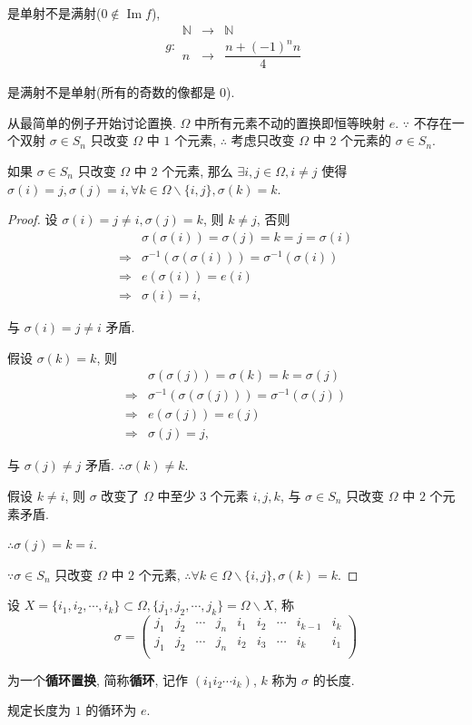 \documentclass{ctexart}
\begin{document}
是单射不是满射($0\notin\operatorname{Im}f$),
\[g:\begin{array}{rcl}
\mathbb{N} & \to & \mathbb{N} \\
n & \to & \dfrac{n+(-1)^nn}{4}
\end{array}\]

是满射不是单射(所有的奇数的像都是 $0$).

从最简单的例子开始讨论置换. $\Omega$ 中所有元素不动的置换即恒等映射 $e$. $\because$ 不存在一个双射 $\sigma\in S_n$ 只改变 $\Omega$ 中 $1$ 个元素, $\therefore$ 考虑只改变 $\Omega$ 中 $2$ 个元素的 $\sigma\in S_n$.
\begin{lemma}
    如果 $\sigma\in S_n$ 只改变 $\Omega$ 中 $2$ 个元素, 那么 $\exists i,j\in\Omega,i\neq j$ 使得 $\sigma(i)=j,\sigma(j)=i,\forall k\in\Omega\backslash\{i,j\},\sigma(k)=k$.
\end{lemma}
\begin{proof}
    设 $\sigma(i)=j\neq i,\sigma(j)=k$, 则 $k\neq j$, 否则
    \begin{align*}
        & \sigma(\sigma(i))=\sigma(j)=k=j=\sigma(i) \\
        \Rightarrow & \sigma^{-1}(\sigma(\sigma(i)))=\sigma^{-1}(\sigma(i)) \\
        \Rightarrow & e(\sigma(i))=e(i) \\
        \Rightarrow & \sigma(i)=i,
    \end{align*}

    与 $\sigma(i)=j\neq i$ 矛盾.

    假设 $\sigma(k)=k$, 则
    \begin{align*}
        & \sigma(\sigma(j))=\sigma(k)=k=\sigma(j) \\
        \Rightarrow & \sigma^{-1}(\sigma(\sigma(j)))=\sigma^{-1}(\sigma(j)) \\
        \Rightarrow & e(\sigma(j))=e(j) \\
        \Rightarrow & \sigma(j)=j,
    \end{align*}
    
    与 $\sigma(j)\neq j$ 矛盾. $\therefore\sigma(k)\neq k$.
    
    假设 $k\neq i$, 则 $\sigma$ 改变了 $\Omega$ 中至少 $3$ 个元素 $i,j,k$, 与 $\sigma\in S_n$ 只改变 $\Omega$ 中 $2$ 个元素矛盾.

    $\therefore\sigma(j)=k=i$.

    $\because\sigma\in S_n$ 只改变 $\Omega$ 中 $2$ 个元素, $\therefore\forall k\in\Omega\backslash\{i,j\},\sigma(k)=k.$
\end{proof}
\begin{definition}
    设 $X=\{i_1,i_2,\cdots,i_k\}\subset\Omega,\{j_1,j_2,\cdots,j_k\}=\Omega\backslash X$, 称
    \[\sigma=\begin{pmatrix}
        j_1 & j_2 & \cdots & j_n & i_1 & i_2 & \cdots & i_{k-1} & i_k \\
        j_1 & j_2 & \cdots & j_n & i_2 & i_3 & \cdots & i_k & i_1 \\
    \end{pmatrix}\]

    为一个\textbf{循环置换}, 简称\textbf{循环}, 记作 $(i_1i_2\cdots i_k)$, $k$ 称为 $\sigma$ 的长度.

    规定长度为 $1$ 的循环为 $e$.
\end{definition}
\end{document}
